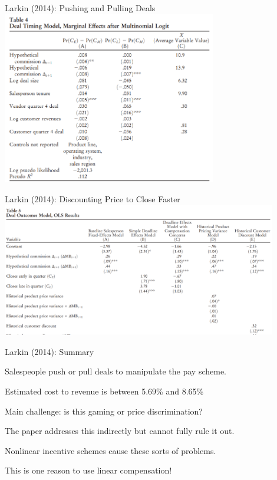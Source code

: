 \documentclass[aspectratio=169,usenames,dvipsnames]{beamer}
\newenvironment{wideitemize}{\itemize\addtolength{\itemsep}{10pt}}{\enditemize}
\begin{document}
\begin{frame}[c]{Larkin (2014): Pushing and Pulling Deals}
\centering
\includegraphics[width=0.7\textwidth]{pictures/larkin_pushpull.png}

\end{frame}

\begin{frame}[c]{Larkin (2014): Discounting Price to Close Faster}
\centering
\includegraphics[width=0.9\textwidth]{pictures/larkin_discount.png}

\end{frame}


\begin{frame}{Larkin (2014): Summary}

\begin{wideitemize}
    \item Salespeople push or pull deals to manipulate the pay scheme.
    \item Estimated cost to revenue is between 5.69\% and 8.65\%
    \item Main challenge: is this gaming or price discrimination?
    \item The paper addresses this indirectly but cannot fully rule it out.
    \item Nonlinear incentive schemes cause these sorts of problems.
    \item This is one reason to use linear compensation!
\end{wideitemize}
\end{frame}
\end{document}
